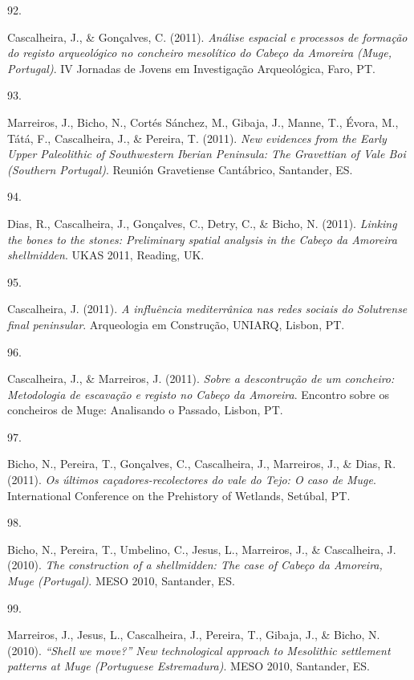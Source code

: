 \documentclass[11pt,a4paper,]{awesome-cv}
\newlength{\cslhangindent}
\newlength{\csllabelwidth}
\newenvironment{CSLReferences}[2] %
 {\begin{list}{}{%
  \setlength{\itemindent}{0pt}
  \setlength{\leftmargin}{0pt}
  \setlength{\parsep}{0pt}
  \ifodd #1
   \setlength{\leftmargin}{\cslhangindent}
   \setlength{\itemindent}{-1\cslhangindent}
  \fi
  \setlength{\itemsep}{#2\baselineskip}}}
 {\end{list}}
\newcommand{\CSLLeftMargin}[1]{\parbox[t]{\csllabelwidth}{\strut#1\strut}}
\newcommand{\CSLRightInline}[1]{\parbox[t]{\linewidth - \csllabelwidth}{\strut#1\strut}}
\begin{document}
\begin{CSLReferences}{0}{0}
\CSLLeftMargin{92. }%
\CSLRightInline{Cascalheira, J., \& Gonçalves, C. (2011). \emph{Análise
espacial e processos de formação do registo arqueológico no concheiro
mesolítico do Cabeço da Amoreira (Muge, Portugal)}. IV Jornadas de
Jovens em Investigação Arqueológica, Faro, PT.}

\CSLLeftMargin{93. }%
\CSLRightInline{Marreiros, J., Bicho, N., Cortés Sánchez, M., Gibaja,
J., Manne, T., Évora, M., Tátá, F., Cascalheira, J., \& Pereira, T.
(2011). \emph{New evidences from the Early Upper Paleolithic of
Southwestern Iberian Peninsula: The Gravettian of Vale Boi (Southern
Portugal)}. Reunión Gravetiense Cantábrico, Santander, ES.}

\CSLLeftMargin{94. }%
\CSLRightInline{Dias, R., Cascalheira, J., Gonçalves, C., Detry, C., \&
Bicho, N. (2011). \emph{Linking the bones to the stones: Preliminary
spatial analysis in the Cabeço da Amoreira shellmidden}. UKAS 2011,
Reading, UK.}

\CSLLeftMargin{95. }%
\CSLRightInline{Cascalheira, J. (2011). \emph{A influência mediterrânica
nas redes sociais do Solutrense final peninsular}. Arqueologia em
Construção, UNIARQ, Lisbon, PT.}

\CSLLeftMargin{96. }%
\CSLRightInline{Cascalheira, J., \& Marreiros, J. (2011). \emph{Sobre a
descontrução de um concheiro: Metodologia de escavação e registo no
Cabeço da Amoreira}. Encontro sobre os concheiros de Muge: Analisando o
Passado, Lisbon, PT.}

\CSLLeftMargin{97. }%
\CSLRightInline{Bicho, N., Pereira, T., Gonçalves, C., Cascalheira, J.,
Marreiros, J., \& Dias, R. (2011). \emph{Os últimos
caçadores-recolectores do vale do Tejo: O caso de Muge}. International
Conference on the Prehistory of Wetlands, Setúbal, PT.}

\CSLLeftMargin{98. }%
\CSLRightInline{Bicho, N., Pereira, T., Umbelino, C., Jesus, L.,
Marreiros, J., \& Cascalheira, J. (2010). \emph{The construction of a
shellmidden: The case of Cabeço da Amoreira, Muge (Portugal)}. MESO
2010, Santander, ES.}

\CSLLeftMargin{99. }%
\CSLRightInline{Marreiros, J., Jesus, L., Cascalheira, J., Pereira, T.,
Gibaja, J., \& Bicho, N. (2010). \emph{{``Shell we move?''} New
technological approach to Mesolithic settlement patterns at Muge
(Portuguese Estremadura)}. MESO 2010, Santander, ES.}


\end{CSLReferences}
\end{document}
